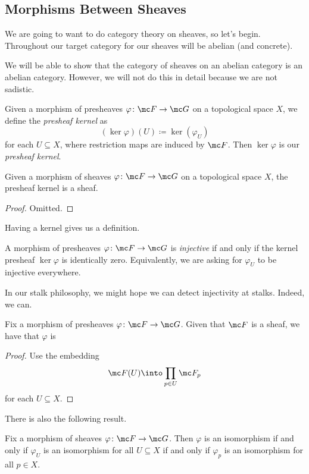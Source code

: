 \documentclass[../notes.tex]{subfiles}
\begin{document}
\subsection{Morphisms Between Sheaves}
We are going to want to do category theory on sheaves, so let's begin. Throughout our target category for our sheaves will be abelian (and concrete).
\begin{remark}
	We will be able to show that the category of sheaves on an abelian category is an abelian category. However, we will not do this in detail because we are not sadistic.
\end{remark}
\begin{definition}
	Given a morphism of presheaves $\varphi\colon\mc F\to\mc G$ on a topological space $X$, we define the \textit{presheaf kernel} as
	\[(\ker\varphi)(U)\coloneqq\ker(\varphi_U)\]
	for each $U\subseteq X$, where restriction maps are induced by $\mc F$. Then $\ker\varphi$ is our \textit{presheaf kernel}.
\end{definition}
\begin{lemma}
	Given a morphism of sheaves $\varphi\colon\mc F\to\mc G$ on a topological space $X$, the presheaf kernel is a sheaf.
\end{lemma}
\begin{proof}
	Omitted.
\end{proof}
Having a kernel gives us a definition.
\begin{definition}[Injective]
	A morphism of presheaves $\varphi\colon\mc F\to\mc G$ is \textit{injective} if and only if the kernel presheaf $\ker\varphi$ is identically zero. Equivalently, we are asking for $\varphi_U$ to be injective everywhere.
\end{definition}
In our stalk philosophy, we might hope we can detect injectivity at stalks. Indeed, we can.
\begin{proposition}
	Fix a morphism of presheaves $\varphi\colon\mc F\to\mc G$. Given that $\mc F$ is a sheaf, we have that $\varphi$ is 
\end{proposition}
\begin{proof}
	Use the embedding
	\[\mc F(U)\into\prod_{p\in U}\mc F_p\]
	for each $U\subseteq X$.
\end{proof}
There is also the following result.
\begin{proposition}
	Fix a morphism of sheaves $\varphi\colon\mc F\to\mc G$. Then $\varphi$ is an isomorphism if and only if $\varphi_U$ is an isomorphism for all $U\subseteq X$ if and only if $\varphi_p$ is an isomorphism for all $p\in X$.
\end{proposition}
\end{document}
